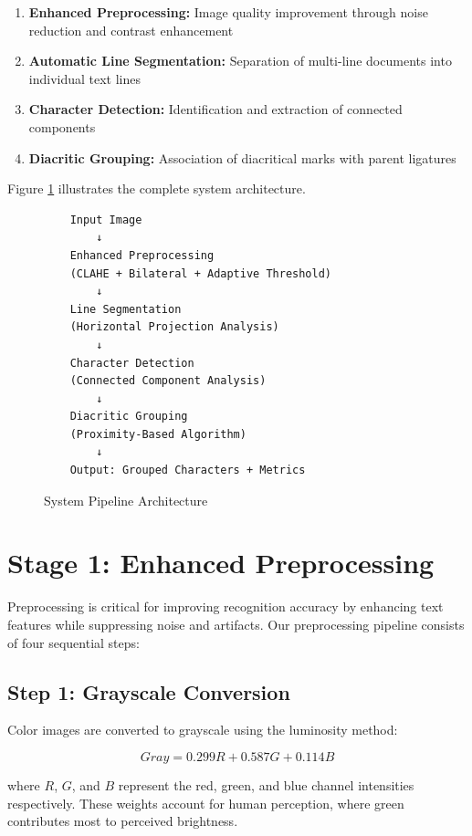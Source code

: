 \documentclass[12pt,a4paper,oneside]{report}
\begin{document}
\begin{enumerate}
    \item \textbf{Enhanced Preprocessing:} Image quality improvement through noise reduction and contrast enhancement
    \item \textbf{Automatic Line Segmentation:} Separation of multi-line documents into individual text lines
    \item \textbf{Character Detection:} Identification and extraction of connected components
    \item \textbf{Diacritic Grouping:} Association of diacritical marks with parent ligatures
\end{enumerate}

Figure \ref{fig:pipeline} illustrates the complete system architecture.

\begin{figure}[h]
    \centering
    \begin{verbatim}
    Input Image
        ↓
    Enhanced Preprocessing
    (CLAHE + Bilateral + Adaptive Threshold)
        ↓
    Line Segmentation
    (Horizontal Projection Analysis)
        ↓
    Character Detection
    (Connected Component Analysis)
        ↓
    Diacritic Grouping
    (Proximity-Based Algorithm)
        ↓
    Output: Grouped Characters + Metrics
    \end{verbatim}
    \caption{System Pipeline Architecture}
    \label{fig:pipeline}
\end{figure}

\section{Stage 1: Enhanced Preprocessing}

Preprocessing is critical for improving recognition accuracy by enhancing text features while suppressing noise and artifacts. Our preprocessing pipeline consists of four sequential steps:

\subsection{Step 1: Grayscale Conversion}

Color images are converted to grayscale using the luminosity method:

\begin{equation}
    Gray = 0.299R + 0.587G + 0.114B
\end{equation}

where $R$, $G$, and $B$ represent the red, green, and blue channel intensities respectively. These weights account for human perception, where green contributes most to perceived brightness.
\end{document}
